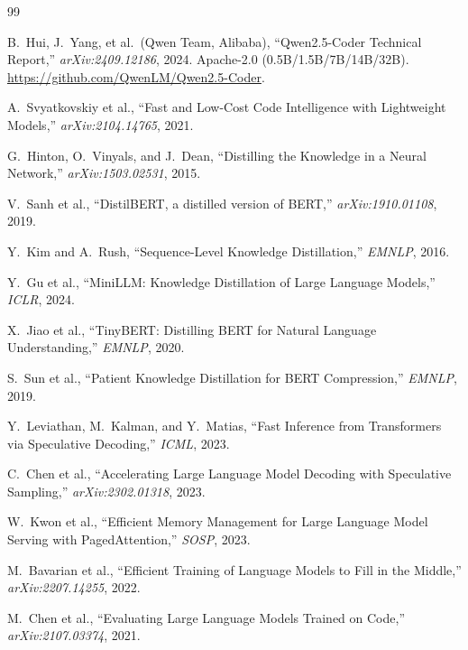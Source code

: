 \documentclass[11pt,a4paper]{article}
\begin{document}
\begin{thebibliography}{99}

B.~Hui, J.~Yang, et al.\ (Qwen Team, Alibaba), ``Qwen2.5-Coder Technical Report,''
\textit{arXiv:2409.12186}, 2024. Apache-2.0 (0.5B/1.5B/7B/14B/32B).
\url{https://github.com/QwenLM/Qwen2.5-Coder}.

A.~Svyatkovskiy et al., ``Fast and Low-Cost Code Intelligence with Lightweight Models,''
\textit{arXiv:2104.14765}, 2021.

G.~Hinton, O.~Vinyals, and J.~Dean, ``Distilling the Knowledge in a Neural Network,''
\textit{arXiv:1503.02531}, 2015.

V.~Sanh et al., ``DistilBERT, a distilled version of BERT,'' \textit{arXiv:1910.01108}, 2019.

Y.~Kim and A.~Rush, ``Sequence-Level Knowledge Distillation,'' \textit{EMNLP}, 2016.

Y.~Gu et al., ``MiniLLM: Knowledge Distillation of Large Language Models,''
\textit{ICLR}, 2024.

X.~Jiao et al., ``TinyBERT: Distilling BERT for Natural Language Understanding,''
\textit{EMNLP}, 2020.

S.~Sun et al., ``Patient Knowledge Distillation for BERT Compression,''
\textit{EMNLP}, 2019.

Y.~Leviathan, M.~Kalman, and Y.~Matias, ``Fast Inference from Transformers via Speculative
Decoding,'' \textit{ICML}, 2023.

C.~Chen et al., ``Accelerating Large Language Model Decoding with Speculative Sampling,''
\textit{arXiv:2302.01318}, 2023.

W.~Kwon et al., ``Efficient Memory Management for Large Language Model Serving with PagedAttention,''
\textit{SOSP}, 2023.

M.~Bavarian et al., ``Efficient Training of Language Models to Fill in the Middle,''
\textit{arXiv:2207.14255}, 2022.

M.~Chen et al., ``Evaluating Large Language Models Trained on Code,''
\textit{arXiv:2107.03374}, 2021.

\end{thebibliography}
\end{document}
